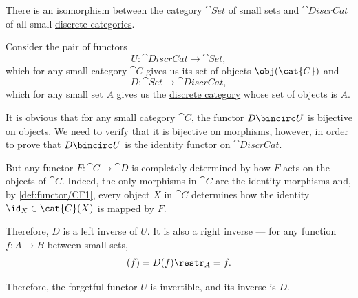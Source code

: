 \begin{example}\label{ex:set_discr_cat_isomorphism}
  There is an isomorphism between the category \( \cat{Set} \) of small sets and \( \cat{DiscrCat} \) of all small \hyperref[def:discrete_category]{discrete categories}.

  Consider the pair of functors
  \begin{equation*}
    U: \cat{DiscrCat} \to \cat{Set},
  \end{equation*}
  which for any small category \( \cat{C} \) gives us its set of objects \( \obj(\cat{C}) \) and
  \begin{equation*}
    D: \cat{Set} \to \cat{DiscrCat},
  \end{equation*}
  which for any small set \( A \) gives us the \hyperref[def:discrete_category]{discrete category} whose set of objects is \( A \).

  It is obvious that for any small category \( \cat{C} \), the functor \( D \bincirc U \) is bijective on objects. We need to verify that it is bijective on morphisms, however, in order to prove that \( D \bincirc U \) is the identity functor on \( \cat{DiscrCat} \).

  But any functor \( F: \cat{C} \to \cat{D} \) is completely determined by how \( F \) acts on the objects of \( \cat{C} \). Indeed, the only morphisms in \( \cat{C} \) are the identity morphisms and, by \ref{def:functor/CF1}, every object \( X \) in \( \cat{C} \) determines how the identity \( \id_X \in \cat{C}(X) \) is mapped by \( F \).

  Therefore, \( D \) is a left inverse of \( U \). It is also a right inverse --- for any function \( f: A \to B \) between small sets,
  \begin{equation*}
    [U \bincirc D](f) = D(f)\restr_{A} = f.
  \end{equation*}

  Therefore, the forgetful functor \( U \) is invertible, and its inverse is \( D \).
\end{example}

